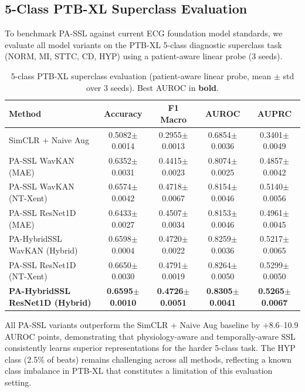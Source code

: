 \documentclass[journal,10pt]{IEEEtran}
\begin{document}
\subsection{5-Class PTB-XL Superclass Evaluation}

To benchmark PA-SSL against current ECG foundation model standards, we evaluate all model variants on the PTB-XL 5-class diagnostic superclass task (NORM, MI, STTC, CD, HYP) using a patient-aware linear probe (3 seeds).

\begin{table}[t]
\centering
\caption{5-class PTB-XL superclass evaluation (patient-aware linear probe, mean $\pm$ std over 3 seeds). Best AUROC in \textbf{bold}.}
\label{tab:multiclass}
\begin{tabular}{lcccc}
\toprule
\textbf{Method} & \textbf{Accuracy} & \textbf{F1 Macro} & \textbf{AUROC} & \textbf{AUPRC} \\
\midrule
SimCLR + Naive Aug & 0.5082\tiny{$\pm$0.0014} & 0.2955\tiny{$\pm$0.0013} & 0.6854\tiny{$\pm$0.0036} & 0.3401\tiny{$\pm$0.0049} \\
PA-SSL WavKAN (MAE) & 0.6352\tiny{$\pm$0.0031} & 0.4415\tiny{$\pm$0.0023} & 0.8074\tiny{$\pm$0.0025} & 0.4857\tiny{$\pm$0.0042} \\
PA-SSL WavKAN (NT-Xent) & 0.6574\tiny{$\pm$0.0042} & 0.4718\tiny{$\pm$0.0067} & 0.8154\tiny{$\pm$0.0046} & 0.5140\tiny{$\pm$0.0056} \\
PA-SSL ResNet1D (MAE) & 0.6433\tiny{$\pm$0.0027} & 0.4507\tiny{$\pm$0.0034} & 0.8153\tiny{$\pm$0.0046} & 0.4961\tiny{$\pm$0.0045} \\
PA-HybridSSL WavKAN (Hybrid) & 0.6598\tiny{$\pm$0.0004} & 0.4720\tiny{$\pm$0.0022} & 0.8259\tiny{$\pm$0.0036} & 0.5217\tiny{$\pm$0.0065} \\
PA-SSL ResNet1D (NT-Xent) & 0.6650\tiny{$\pm$0.0030} & 0.4791\tiny{$\pm$0.0019} & 0.8264\tiny{$\pm$0.0050} & 0.5299\tiny{$\pm$0.0050} \\
\textbf{PA-HybridSSL ResNet1D (Hybrid)} & \textbf{0.6595\tiny{$\pm$0.0010}} & \textbf{0.4726\tiny{$\pm$0.0051}} & \textbf{0.8305\tiny{$\pm$0.0041}} & \textbf{0.5265\tiny{$\pm$0.0067}} \\
\bottomrule
\end{tabular}
\vspace{0.5em}
\end{table}

\noindent All PA-SSL variants outperform the SimCLR + Naive Aug baseline by $+$8.6--10.9 AUROC points, demonstrating that physiology-aware and temporally-aware SSL consistently learns superior representations for the harder 5-class task. The HYP class (2.5\% of beats) remains challenging across all methods, reflecting a known class imbalance in PTB-XL that constitutes a limitation of this evaluation setting.
\end{document}
